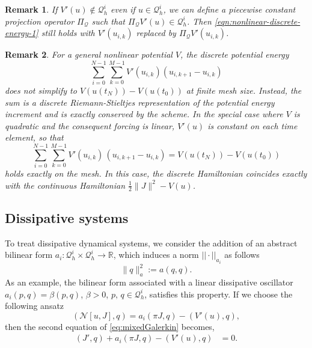 \documentclass[12pt]{article}
\newtheorem{remark}{Remark}
\begin{document}
\begin{remark}
If $V'(u) \notin \mathcal{Q}_h^i$ even if $u \in \mathcal{Q}_h^i$, we can define a piecewise constant projection operator $\Pi_{\mathcal{Q}}$ such that $\Pi_{\mathcal{Q}} V'(u) \in \mathcal{Q}_h^i$. Then \eqref{eqn:nonlinear-discrete-energy-1} still holds with $V'(u_{i,k})$ replaced by $\Pi_{\mathcal{Q}} V'(u_{i,k})$.
\end{remark}

\begin{remark}
For a general nonlinear potential $V$, the discrete potential energy
\[
\sum_{i=0}^{N-1}\sum_{k=0}^{M-1} V'(u_{i,k}) \left( u_{i,k+1} - u_{i,k}\right)
\]
does not simplify to
$V(u(t_N))-V(u(t_0))$ at finite mesh size.   Instead, the sum is a discrete Riemann-Stieltjes representation of the
potential energy increment and is \emph{exactly conserved} by the scheme.
In the special case where $V$ is quadratic and the consequent forcing is linear, 
$V'(u)$ is constant on each time element,
so that
\[
\sum_{i=0}^{N-1}\sum_{k=0}^{M-1} V'(u_{i,k})\,(u_{i,k+1}-u_{i,k})
= V(u(t_N))-V(u(t_0))
\]
holds exactly on the mesh. In this case, the discrete Hamiltonian coincides exactly with the continuous Hamiltonian
$\tfrac12\|J\|^2 - V(u)$.
\end{remark}

\subsection{Dissipative systems}
To treat dissipative dynamical systems, we consider the addition of an abstract bilinear form $a_i:\mathcal{Q}^i_h\times\mathcal{Q}^i_h\rightarrow\mathbb{R}$, which induces a norm $||\cdot||_{a_i}$ as follows
\begin{equation}
\| q \|_a^2:= a(q,q).
\end{equation}
As an example, the bilinear form associated with a linear dissipative oscillator $a_i(p,q) = \beta (p,q)$, $\beta > 0$, $p, \, q \in \mathcal{Q}_h^i$, satisfies this property. If we choose the following ansatz 
\begin{equation}
  ( \mathcal{N}[u,J], q) = a_i(\pi J,q) -(V'(u),q),
\end{equation}
then the second equation of \eqref{eq:mixedGalerkin} becomes, 
\begin{equation}\label{eqn:hamiltonianMortar4}
\begin{aligned}
  (J',q) + a_i(\pi J,q) - (V'(u),q) &= 0.
\end{aligned}
\end{equation}
\end{document}
